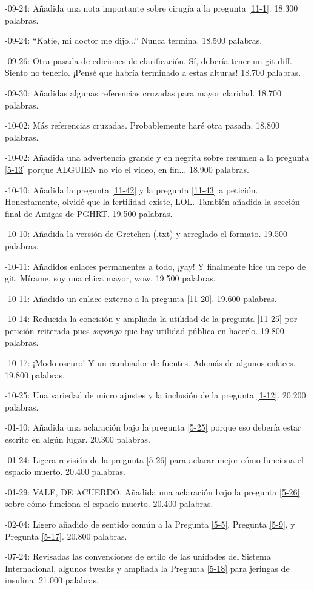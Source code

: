 \documentclass{article}
\begin{document}
-09-24: Añadida una nota importante sobre cirugía a la pregunta \ref{11-1}. 18.300 palabras.

-09-24: “Katie, mi doctor me dijo...” Nunca termina. 18.500 palabras.

-09-26: Otra pasada de ediciones de clarificación. Sí, debería tener un git diff. Siento no tenerlo. ¡Pensé que habría terminado a estas alturas! 18.700 palabras.

-09-30: Añadidas algunas referencias cruzadas para mayor claridad. 18.700 palabras.

-10-02: Más referencias cruzadas. Probablemente haré otra pasada. 18.800 palabras.

-10-02: Añadida una advertencia grande y en negrita sobre resumen a la pregunta \ref{5-13} porque ALGUIEN no vio el video, en fin... 18.900 palabras.

-10-10: Añadida la pregunta \ref{11-42} y la pregunta \ref{11-43} a petición. Honestamente, olvidé que la fertilidad existe, LOL. También añadida la sección final de Amigas de PGHRT. 19.500 palabras.

-10-10: Añadida la versión de Gretchen (.txt) y arreglado el formato. 19.500 palabras.

-10-11: Añadidos enlaces permanentes a todo, ¡yay! Y finalmente hice un repo de git. Mírame, soy una chica mayor, wow. 19.500 palabras.

-10-11: Añadido un enlace externo a la pregunta \ref{11-20}. 19.600 palabras.

-10-14: Reducida la concisión y ampliada la utilidad de la pregunta \ref{11-25} por petición reiterada pues \textit{supongo} que hay utilidad pública en hacerlo. 19.800 palabras.

-10-17: ¡Modo oscuro! Y un cambiador de fuentes. Además de algunos enlaces. 19.800 palabras.

-10-25: Una variedad de micro ajustes y la inclusión de la pregunta \ref{1-12}. 20.200 palabras.

-01-10: Añadida una aclaración bajo la pregunta \ref{5-25} porque eso debería estar escrito en algún lugar. 20.300 palabras.

-01-24: Ligera revisión de la pregunta \ref{5-26} para aclarar mejor cómo funciona el espacio muerto. 20.400 palabras.

-01-29: VALE, DE ACUERDO. Añadida una aclaración bajo la pregunta \ref{5-26} sobre cómo funciona el espacio muerto. 20.400 palabras.

-02-04: Ligero añadido de sentido común a la Pregunta \ref{5-5}, Pregunta \ref{5-9}, y Pregunta \ref{5-17}. 20.800 palabras.

-07-24: Revisadas las convenciones de estilo de las unidades del Sistema Internacional, algunos tweaks y ampliada la Pregunta \ref{5-18} para jeringas de insulina. 21.000 palabras.
\end{document}
